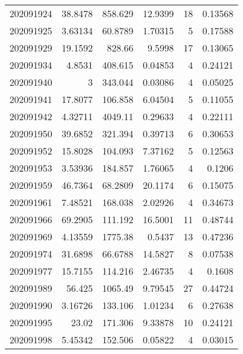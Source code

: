 \begin{tabular}{rrrrrr}
 202091924 &         38.8478  &      858.629  &           12.9399  &          18 & 0.13568 \\
 202091925 &          3.63134 &       60.8789 &            1.70315 &           5 & 0.17588 \\
 202091929 &         19.1592  &      828.66   &            9.5998  &          17 & 0.13065 \\
 202091934 &          4.8531  &      408.615  &            0.04853 &           4 & 0.24121 \\
 202091940 &          3       &      343.044  &            0.03086 &           4 & 0.05025 \\
 202091941 &         17.8077  &      106.858  &            6.04504 &           5 & 0.11055 \\
 202091942 &          4.32711 &     4049.11   &            0.29633 &           4 & 0.22111 \\
 202091950 &         39.6852  &      321.394  &            0.39713 &           6 & 0.30653 \\
 202091952 &         15.8028  &      104.093  &            7.37162 &           5 & 0.12563 \\
 202091953 &          3.53936 &      184.857  &            1.76065 &           4 & 0.1206  \\
 202091959 &         46.7364  &       68.2809 &           20.1174  &           6 & 0.15075 \\
 202091961 &          7.48521 &      168.038  &            2.02926 &           4 & 0.34673 \\
 202091966 &         69.2905  &      111.192  &           16.5001  &          11 & 0.48744 \\
 202091969 &          4.13559 &     1775.38   &            0.5437  &          13 & 0.47236 \\
 202091974 &         31.6898  &       66.6788 &           14.5827  &           8 & 0.07538 \\
 202091977 &         15.7155  &      114.216  &            2.46735 &           4 & 0.1608  \\
 202091989 &         56.425   &     1065.49   &            9.79545 &          27 & 0.44724 \\
 202091990 &          3.16726 &      133.106  &            1.01234 &           6 & 0.27638 \\
 202091995 &         23.02    &      171.306  &            9.33878 &          10 & 0.24121 \\
 202091998 &          5.45342 &      152.506  &            0.05822 &           4 & 0.03015 \\

\end{tabular}
